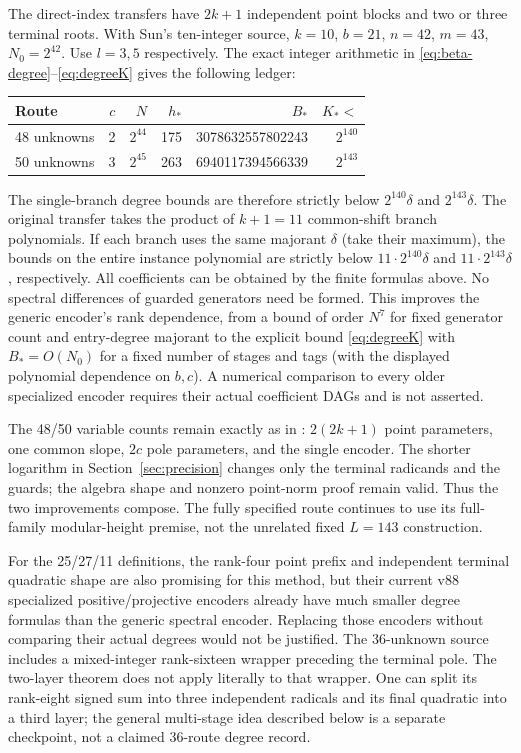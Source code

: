 \documentclass[11pt]{article}
\begin{document}
The direct-index transfers \cite{index} have $2k+1$ independent point
blocks and two or three terminal roots. With Sun's ten-integer source,
$k=10$, $b=21$, $n=42$, $m=43$, $N_0=2^{42}$. Use $l=3,5$ respectively.
The exact integer arithmetic in \eqref{eq:beta-degree}--\eqref{eq:degreeK}
gives the following ledger:
\begin{center}\small
\begin{tabular}{lrrrrr}\toprule
Route & $c$ & $N$ & $h_*$ & $B_*$ & $K_*<$\\\midrule
48 unknowns & 2 & $2^{44}$ & 175 & 3078632557802243 & $2^{140}$\\
50 unknowns & 3 & $2^{45}$ & 263 & 6940117394566339 & $2^{143}$\\\bottomrule
\end{tabular}
\end{center}
The single-branch degree bounds are therefore strictly below
$2^{140}\delta$ and $2^{143}\delta$. The original transfer takes the
product of $k+1=11$ common-shift branch polynomials. If each branch
uses the same majorant $\delta$ (take their maximum), the bounds on
the entire instance polynomial are strictly below
$11\cdot2^{140}\delta$ and $11\cdot2^{143}\delta$, respectively.
All coefficients can be obtained by the finite formulas above.
No spectral differences of guarded generators need be formed. This
improves the generic encoder's rank dependence, from a bound of order
$N^7$ for fixed generator count and entry-degree majorant to the
explicit bound \eqref{eq:degreeK} with $B_*=O(N_0)$ for a fixed
number of stages and tags (with the displayed polynomial dependence
on $b,c$). A numerical comparison to every older specialized encoder
requires their actual coefficient DAGs and is not asserted.

The 48/50 variable counts remain exactly as in \cite{index}:
$2(2k+1)$ point parameters, one common slope, $2c$ pole parameters,
and the single encoder. The shorter logarithm in Section~\ref{sec:precision}
changes only the terminal radicands and the guards; the algebra shape
and nonzero point-norm proof remain valid. Thus the two improvements
compose. The fully specified route continues to use its full-family
modular-height premise, not the unrelated fixed $L=143$ construction.

For the 25/27/11 definitions, the rank-four point prefix and independent
terminal quadratic shape are also promising for this method, but their
current v88 specialized positive/projective encoders already have much
smaller degree formulas than the generic spectral encoder. Replacing
those encoders without comparing their actual degrees would not be
justified. The 36-unknown source includes a mixed-integer rank-sixteen
wrapper preceding the terminal pole. The two-layer theorem does not
apply literally to that wrapper. One can split its rank-eight signed
sum into three independent radicals and its final quadratic into a
third layer; the general multi-stage idea described below is a
separate checkpoint, not a claimed 36-route degree record.
\end{document}
